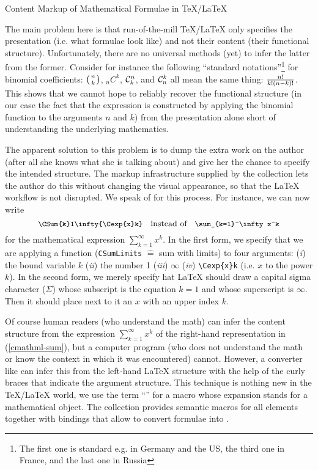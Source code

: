 \begin{tsubsection}{Content Markup of Mathematical Formulae in {\TeX/\LaTeX}}

  The main problem here is that run-of-the-mill {\TeX/\LaTeX} only specifies the
  presentation (i.e. what formulae look like) and not their content (their functional
  structure). Unfortunately, there are no universal methods (yet) to infer the latter from
  the former.  Consider for instance the following ``standard notations''\footnote{The
    first one is standard e.g. in Germany and the US, the third one in France, and the
    last one in Russia} for binomial coefficients: $\left(n\atop k\right)$, $_nC^k$,
  ${\cal C}^n_k$, and ${\cal C}^k_n$ all mean the same thing: $n!\over k!(n-k)!$. This
  shows that we cannot hope to reliably recover the functional structure (in our case the
  fact that the expression is constructed by applying the binomial function to the
  arguments $n$ and $k$) from the presentation alone short of understanding the underlying
  mathematics.
 
  The apparent solution to this problem is to dump the extra work on the author (after all
  she knows what she is talking about) and give her the chance to specify the intended
  structure. The markup infrastructure supplied by the {\stex} collection lets the author
  do this without changing the visual appearance, so that the {\LaTeX} workflow is not
  disrupted. We speak of {} for this process. For instance,
  we can now write
\begin{equation}\label{cmathml-sum}\footnotesize
  \verb|\CSum{k}1\infty{\Cexp{x}k}| \quad\hbox{\normalsize instead of}\quad
  \verb|\sum_{k=1}^\infty x^k|
\end{equation}
for the mathematical expression $\sum_{k=1}^\infty x^k$. In the first form, we specify
that we are applying a function (\verb|CSumLimits| $\hat=$ sum with limits) to four
arguments: ({\sl{i}}) the bound variable $k$ ({\sl{ii}}) the number 1 ({\sl{iii}})
$\infty$ ({\sl{iv}}) \verb|\Cexp{x}k| (i.e. $x$ to the power $k$).  In the second form, we
merely specify hat {\LaTeX} should draw a capital sigma character ($\Sigma$) whose
subscript is the equation $k=1$ and whose superscript is $\infty$. Then it should place
next to it an $x$ with an upper index $k$.

Of course human readers (who understand the math) can infer the content structure from the
expression $\sum_{k=1}^\infty x^k$ of the right-hand representation in
(\ref{cmathml-sum}), but a computer program (who does not understand the math or know the
context in which it was encountered) cannot. However, a converter like {\latexml} can
infer this from the left-hand {\LaTeX} structure with the help of the curly braces that
indicate the argument structure. This technique is nothing new in the {\TeX/\LaTeX} world,
we use the term ``{}'' for a macro whose expansion stands for a
mathematical object. The {\stex} collection provides semantic macros for all {\cmathml}
elements together with {\latexml} bindings that allow to convert {\stex} formulae into
{\mathml}.
\end{tsubsection}

